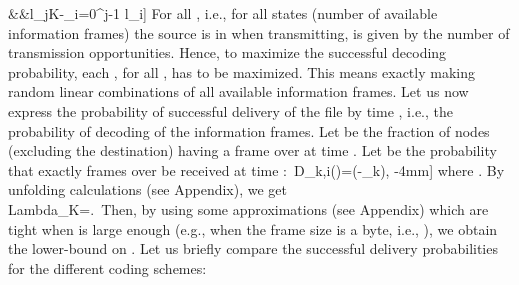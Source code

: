 \documentclass[10pt,twocolumn,conference,final]{IEEEtran}
\def\endpf{\hfill}
\begin{document}
&&l_{j}\geq K-\sum_{i=0}^{j-1} l_i\nonumber
-4mm]
For all , i.e., for all states (number of available information frames) the source is in when transmitting,  is given by the number of transmission opportunities. Hence, to maximize the successful decoding probability, each , for all , has to be maximized. This means exactly making random linear combinations of all available information frames.
Let us now express the probability of successful delivery of the file by time , i.e., the probability of decoding of the  information frames. Let  be the fraction of nodes (excluding the destination) having a frame over  at time . Let  be the probability that exactly  frames over  be received at time :\
D_{k,i}(\tau)=\exp(-\Lambda_k)\;,
-4mm]
where . 
By unfolding calculations (see Appendix), we get \\Lambda_K=\lambda{}\;.\
Then, by using some approximations (see Appendix) which are tight when  is large enough (e.g., when the frame size is a byte, i.e., ), we obtain the lower-bound on .
\endpf
Let us briefly compare the successful delivery probabilities for the different coding schemes:
\end{document}
